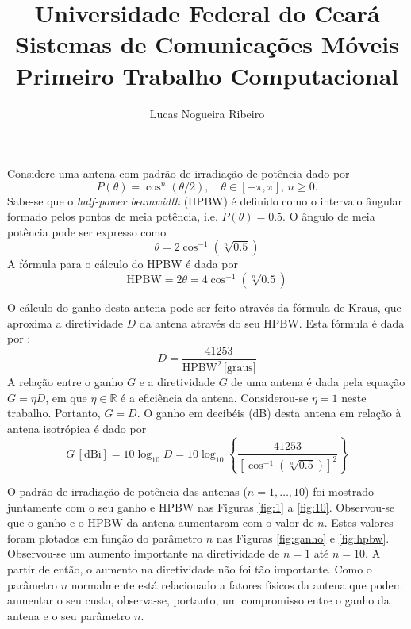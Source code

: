 \documentclass[a4paper,10pt]{article}
\title{\vspace{-3cm}Universidade Federal do Ceará\\Sistemas de Comunicações Móveis\\Primeiro Trabalho Computacional}
\author{Lucas Nogueira Ribeiro}
\date{}
\begin{document}
\maketitle

Considere uma antena com padrão de irradiação de potência dado por 
\begin{equation}
 P(\theta) = \cos^n(\theta / 2),\quad \theta \in [-\pi, \pi], \, n \geq 0.
\end{equation}
Sabe-se que o \emph{half-power beamwidth} (HPBW) é definido como o intervalo ângular formado pelos pontos de meia potência, i.e. $P(\theta) = 0.5$. O ângulo de meia potência pode ser expresso como
\begin{equation}
 \theta = 2\cos^{-1}\left( \sqrt[n]{0.5} \right)
\end{equation}
A fórmula para o cálculo do HPBW é dada por
\begin{equation}
 \text{HPBW} = 2\theta = 4\cos^{-1}\left( \sqrt[n]{0.5} \right)
\end{equation}

O cálculo do ganho desta antena pode ser feito através da fórmula de Kraus, que aproxima a diretividade $D$ da antena através do seu HPBW. Esta fórmula é dada por \cite{balanis}:
\begin{equation}
 D = \frac{41253}{\textrm{HPBW}^2\, \text{[graus]}}
\end{equation}
A relação entre o ganho $G$ e a diretividade $G$ de uma antena é dada pela equação $G=\eta D$, em que $\eta \in \mathbb{R}$ é a eficiência da antena. Considerou-se $\eta=1$ neste trabalho. Portanto, $G=D$. O ganho em decibéis (dB) desta antena em relação à antena isotrópica é dado por
\begin{equation}
 G\,[\text{dBi}] = 10\log_{10}D = 10\log_{10}\left\{ \frac{41253}{\left[ \cos^{-1}\left( \sqrt[n]{0.5} \right) \right]^2} \right\}
\end{equation}	

O padrão de irradiação de potência das antenas ($n=1,\ldots,10$) foi mostrado juntamente com o seu ganho e HPBW nas Figuras \ref{fig:1} a \ref{fig:10}. Observou-se que o ganho e o HPBW da antena aumentaram com o valor de $n$. Estes valores foram plotados em função do parâmetro $n$ nas Figuras \ref{fig:ganho} e \ref{fig:hpbw}. Observou-se um aumento importante na diretividade de $n=1$ até $n=10$. A partir de então, o aumento na diretividade não foi tão importante. Como o parâmetro $n$ normalmente está relacionado a fatores físicos da antena que podem aumentar o seu custo, observa-se, portanto, um compromisso entre o ganho da antena e o seu parâmetro $n$.
\end{document}
